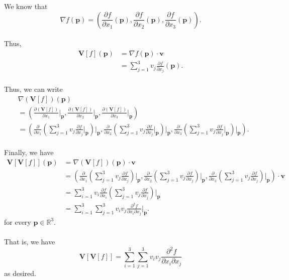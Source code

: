 \documentclass[12 pt, letterpaper]{hmcpset}
\begin{document}
\begin{solution}
	We know that 
	\[
		\nabla f (\mathbf p) = \left ( \frac{\partial f}{\partial x_1}(\mathbf p), \frac{\partial f}{\partial x_2}(\mathbf p), \frac{\partial f}{\partial x_3}(\mathbf p) \right ).
	\] \\
	Thus,
	\[
		\begin{split}
			\mathbf V[f](\mathbf p) & = \nabla f(\mathbf p) \cdot \mathbf v \\
						& = \sum_{j = 1}^3 v_j \frac{\partial f}{\partial x_j}(\mathbf p).
		\end{split}
	\] \\
	Thus, we can write
	\[
		\begin{split}
			& \nabla (\mathbf V[f])(\mathbf p) \\
			& = \left ( \frac{\partial (\mathbf V[f])}{\partial x_1} \Big |_{\mathbf p}, \frac{\partial (\mathbf V[f])}{\partial x_2} \Big |_{\mathbf p}, \frac{\partial (\mathbf V[f])}{\partial x_3} \Big |_{\mathbf p} \right ) \\
			& = \left ( \frac{\partial}{\partial x_1} \left ( \sum_{j = 1}^3 v_j \frac{\partial f}{\partial x_j} \Big |_{\mathbf p} \right ) \Big |_{\mathbf p}, \frac{\partial}{\partial x_2} \left ( \sum_{j = 1}^3 v_j \frac{\partial f}{\partial x_j} \Big |_{\mathbf p} \right ) \Big |_{\mathbf p}, \frac{\partial}{\partial x_3} \left ( \sum_{j = 1}^3 v_j \frac{\partial f}{\partial x_j} \Big |_{\mathbf p} \right ) \Big |_{\mathbf p} \right ).
		\end{split}
	\] \\
	Finally, we have
	\[
		\begin{split}
			\mathbf V[\mathbf V[f]](\mathbf p) & = \nabla(\mathbf V[f])(\mathbf p) \cdot \mathbf v \\
			& = \left ( \frac{\partial}{\partial x_1} \left ( \sum_{j = 1}^3 v_j \frac{\partial f}{\partial x_j} \right ) \Big |_{\mathbf p}, \frac{\partial}{\partial x_2} \left ( \sum_{j = 1}^3 v_j \frac{\partial f}{\partial x_j} \right ) \Big |_{\mathbf p}, \frac{\partial}{\partial x_3} \left ( \sum_{j = 1}^3 v_j \frac{\partial f}{\partial x_j} \right ) \Big |_{\mathbf p} \right ) \cdot \mathbf v \\
			& = \sum_{i = 1}^3 v_i \frac{\partial f}{\partial x_i} \left ( \sum_{j = 1}^3 v_j \frac{\partial f}{\partial x_j} \right ) \Big |_{\mathbf p} \\
			& = \sum_{i = 1}^3 \sum_{j = 1}^3 v_i v_j \frac{\partial^2 f}{\partial x_i \partial x_j} \Big |_{\mathbf p}.
		\end{split}
	\]
	for every $\mathbf p \in \mathbb R^3$. \\\\
	That is, we have 
	\[
		\mathbf V[\mathbf V[f]] = \sum_{i = 1}^3 \sum_{j = 1}^3 v_i v_j \frac{\partial^2 f}{\partial x_i \partial x_j}
	\]
	as desired.
\end{solution}
\end{document}
